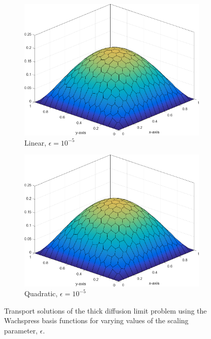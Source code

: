 \begin{figure}
{\begin{subfigure}[b]{0.465\textwidth}
		\centering
		\label{subfig::DL_trans_w1_e5}
		\includegraphics[width=\textwidth]{figures/sec_BF/Sq_poly_WACHSPRESS_k=1_ep=1e-5.png}
		\caption{Linear, $\epsilon = 10^{-5}$}
	\end{subfigure}
	\hfill
	\begin{subfigure}[b]{0.465\textwidth}
		\centering
		\label{subfig::DL_trans_w2_e5}
		\includegraphics[width=\textwidth]{figures/sec_BF/Sq_poly_WACHSPRESS_k=2_ep=1e-5.png}
		\caption{Quadratic, $\epsilon = 10^{-5}$}
	\end{subfigure}
}
\caption{Transport solutions of the thick diffusion limit problem using the Wachspress basis functions for varying values of the scaling parameter, $\epsilon$.}
\label{fig::BF_Results_DL_Wachspress}
\end{figure}

